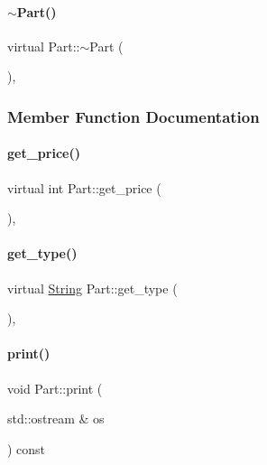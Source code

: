 \mbox{\label{class_part_aaecbb747a7227f7ce3b44caeaf1801c2}} 
\paragraph{\texorpdfstring{$\sim$Part()}{~Part()}}
{\footnotesize\ttfamily virtual Part\+::$\sim$\+Part (\begin{DoxyParamCaption}{ }\end{DoxyParamCaption})\hspace{0.3cm}{\ttfamily [inline]}, {\ttfamily [virtual]}}



\subsubsection{Member Function Documentation}
\mbox{\label{class_part_a38bcd0481433acc24db7d5f978f2c839}} 
\paragraph{\texorpdfstring{get\_price()}{get\_price()}}
{\footnotesize\ttfamily virtual int Part\+::get\+\_\+price (\begin{DoxyParamCaption}{ }\end{DoxyParamCaption})\hspace{0.3cm}{\ttfamily [inline]}, {\ttfamily [virtual]}}

\mbox{\label{class_part_a02569fd3cf6c52b56baceed5d639f487}} 
\paragraph{\texorpdfstring{get\_type()}{get\_type()}}
{\footnotesize\ttfamily virtual \mbox{\hyperlink{class_string}{String}} Part\+::get\+\_\+type (\begin{DoxyParamCaption}{ }\end{DoxyParamCaption})\hspace{0.3cm}{\ttfamily [inline]}, {\ttfamily [virtual]}}

\mbox{\label{class_part_a4fa402b8e8fd4236ff773a7697ab2bc3}} 
\paragraph{\texorpdfstring{print()}{print()}\hspace{0.1cm}{\footnotesize\ttfamily [1/4]}}
{\footnotesize\ttfamily void Part\+::print (\begin{DoxyParamCaption}\item[{std\+::ostream \&}]{os }\end{DoxyParamCaption}) const\hspace{0.3cm}{\ttfamily [virtual]}}




